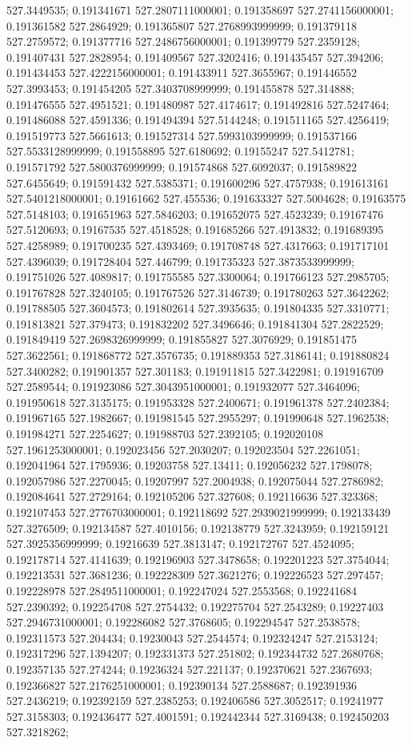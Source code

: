 527.3449535; 0.191341671 527.2807111000001; 0.191358697 527.2741156000001; 0.191361582 527.2864929; 0.191365807 527.2768993999999; 0.191379118 527.2759572; 0.191377716 527.2486756000001; 0.191399779 527.2359128; 0.191407431 527.2828954; 0.191409567 527.3202416; 0.191435457 527.394206; 0.191434453 527.4222156000001; 0.191433911 527.3655967; 0.191446552 527.3993453; 0.191454205 527.3403708999999; 0.191455878 527.314888; 0.191476555 527.4951521; 0.191480987 527.4174617; 0.191492816 527.5247464; 0.191486088 527.4591336; 0.191494394 527.5144248; 0.191511165 527.4256419; 0.191519773 527.5661613; 0.191527314 527.5993103999999; 0.191537166 527.5533128999999; 0.191558895 527.6180692; 0.19155247 527.5412781; 0.191571792 527.5800376999999; 0.191574868 527.6092037; 0.191589822 527.6455649; 0.191591432 527.5385371; 0.191600296 527.4757938; 0.191613161 527.5401218000001; 0.19161662 527.455536; 0.191633327 527.5004628; 0.19163575 527.5148103; 0.191651963 527.5846203; 0.191652075 527.4523239; 0.19167476 527.5120693; 0.19167535 527.4518528; 0.191685266 527.4913832; 0.191689395 527.4258989; 0.191700235 527.4393469; 0.191708748 527.4317663; 0.191717101 527.4396039; 0.191728404 527.446799; 0.191735323 527.3873533999999; 0.191751026 527.4089817; 0.191755585 527.3300064; 0.191766123 527.2985705; 0.191767828 527.3240105; 0.191767526 527.3146739; 0.191780263 527.3642262; 0.191788505 527.3604573; 0.191802614 527.3935635; 0.191804335 527.3310771; 0.191813821 527.379473; 0.191832202 527.3496646; 0.191841304 527.2822529; 0.191849419 527.2698326999999; 0.191855827 527.3076929; 0.191851475 527.3622561; 0.191868772 527.3576735; 0.191889353 527.3186141; 0.191880824 527.3400282; 0.191901357 527.301183; 0.191911815 527.3422981; 0.191916709 527.2589544; 0.191923086 527.3043951000001; 0.191932077 527.3464096; 0.191950618 527.3135175; 0.191953328 527.2400671; 0.191961378 527.2402384; 0.191967165 527.1982667; 0.191981545 527.2955297; 0.191990648 527.1962538; 0.191984271 527.2254627; 0.191988703 527.2392105; 0.192020108 527.1961253000001; 0.192023456 527.2030207; 0.192023504 527.2261051; 0.192041964 527.1795936; 0.19203758 527.13411; 0.192056232 527.1798078; 0.192057986 527.2270045; 0.19207997 527.2004938; 0.192075044 527.2786982; 0.192084641 527.2729164; 0.192105206 527.327608; 0.192116636 527.323368; 0.192107453 527.2776703000001; 0.192118692 527.2939021999999; 0.192133439 527.3276509; 0.192134587 527.4010156; 0.192138779 527.3243959; 0.192159121 527.3925356999999; 0.19216639 527.3813147; 0.192172767 527.4524095; 0.192178714 527.4141639; 0.192196903 527.3478658; 0.192201223 527.3754044; 0.192213531 527.3681236; 0.192228309 527.3621276; 0.192226523 527.297457; 0.192228978 527.2849511000001; 0.192247024 527.2553568; 0.192241684 527.2390392; 0.192254708 527.2754432; 0.192275704 527.2543289; 0.19227403 527.2946731000001; 0.192286082 527.3768605; 0.192294547 527.2538578; 0.192311573 527.204434; 0.19230043 527.2544574; 0.192324247 527.2153124; 0.192317296 527.1394207; 0.192331373 527.251802; 0.192344732 527.2680768; 0.192357135 527.274244; 0.19236324 527.221137; 0.192370621 527.2367693; 0.192366827 527.2176251000001; 0.192390134 527.2588687; 0.192391936 527.2436219; 0.192392159 527.2385253; 0.192406586 527.3052517; 0.19241977 527.3158303; 0.192436477 527.4001591; 0.192442344 527.3169438; 0.192450203 527.3218262; 